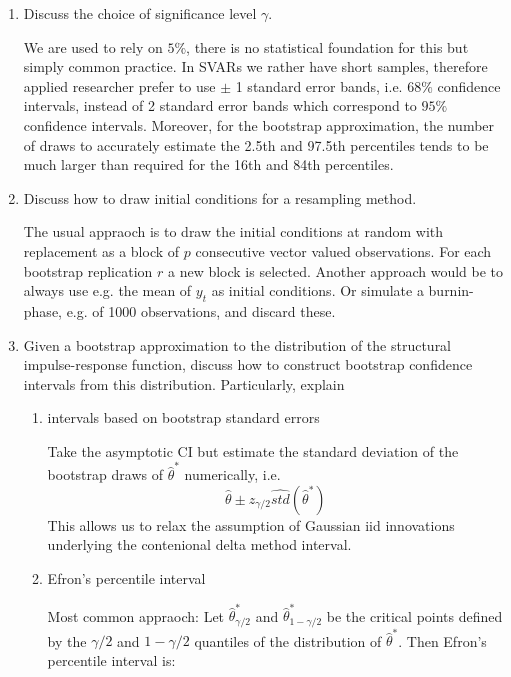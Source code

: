 \begin{enumerate}
    \item Discuss the choice of significance level $\gamma$.
          \begin{solution}
              We are used to rely on $5\%$, there is no statistical foundation for this but simply common practice. In SVARs we rather have short samples, therefore applied researcher prefer to use $\pm$ 1 standard error bands, i.e. $68\%$ confidence intervals, instead of 2 standard error bands which correspond to $95\%$ confidence intervals. Moreover, for the bootstrap approximation, the number of draws to accurately estimate the 2.5th and 97.5th percentiles tends to be much larger than required for the 16th and 84th percentiles.
          \end{solution}
    \item Discuss how to draw initial conditions for a resampling method.
          \begin{solution}
              The usual appraoch is to draw the initial conditions at random with replacement as a block of $p$ consecutive vector valued observations. For each bootstrap replication $r$ a new block is selected. Another approach would be to always use e.g. the mean of $y_t$ as initial conditions. Or simulate a burnin-phase, e.g. of 1000 observations, and discard these.
          \end{solution}
    \item Given a bootstrap approximation to the distribution of the structural impulse-response function, discuss how to construct bootstrap confidence intervals from this distribution. Particularly, explain
          \begin{enumerate}
              \item intervals based on bootstrap standard errors
                    \begin{solution}
                        Take the asymptotic CI but estimate the standard deviation of the bootstrap draws of $\hat{\theta}^\ast$ numerically, i.e.
                        $$\hat{\theta} \pm z_{\gamma/2} \widehat{std}(\hat{\theta}^\ast)$$
                        This allows us to relax the assumption of Gaussian iid innovations underlying the contenional delta method interval.
                    \end{solution}
              \item Efron's percentile interval
                    \begin{solution}
                        Most common appraoch: Let $\hat{\theta}^\ast_{\gamma/2}$ and $\hat{\theta}^\ast_{1-\gamma/2}$ be the critical points defined by the $\gamma/2$ and $1-\gamma/2$ quantiles of the distribution of $\hat{\theta}^\ast$. Then Efron's percentile interval is:

\end{solution}
\end{enumerate}
\end{enumerate}
